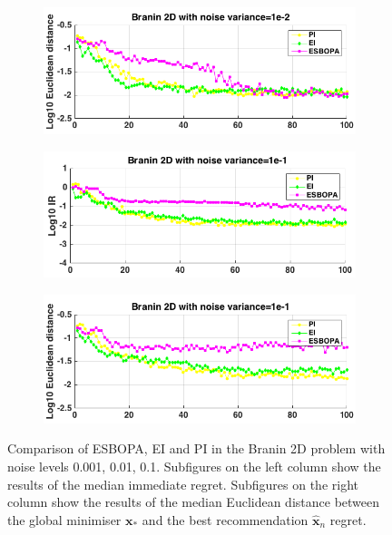 \documentclass[a4paper,11pt]{report}
\begin{document}
\begin{figure} [H]
	\begin{subfigure}{.5\textwidth}
		  \centering
		  \includegraphics[width=1\linewidth]{Branin15noise1e-2_sigma100_ESBOPA_V4_Xnorm.png}
	\end{subfigure}
	\begin{subfigure}{.5\textwidth}
 		 \centering
 		 \includegraphics[width=1\linewidth]{Branin15noise1e-1_sigma100_ESBOPA_V4_IR.png}
	\end{subfigure}	
	\begin{subfigure}{.5\textwidth}
		  \centering
		  \includegraphics[width=1\linewidth]{Branin15noise1e-1_sigma100_ESBOPA_V4_Xnorm.png}
	\end{subfigure}
\caption{ Comparison of ESBOPA, EI and PI in the Branin 2D problem with noise levels 0.001, 0.01, 0.1. Subfigures on the left column show the results of the median immediate regret. Subfigures on the right column show the results of the median Euclidean distance between the global minimiser $\mathbf{x}_{*}$ and the best recommendation $ \hat{\mathbf{x}}_{n}$   regret. }
\end{figure}
\end{document}

